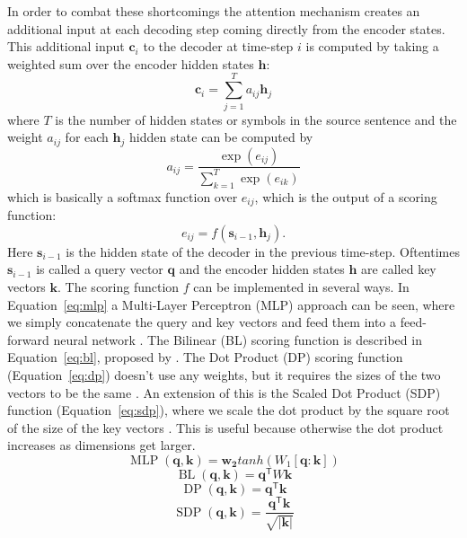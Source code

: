 \documentclass[12pt]{article}
\DeclareMathOperator{\MLP}{MLP}
\DeclareMathOperator{\DP}{DP}
\DeclareMathOperator{\SDP}{SDP}
\DeclareMathOperator{\BL}{BL}
\begin{document}
In order to combat these shortcomings the attention mechanism creates an additional input at each decoding step coming directly from the encoder states. This additional input \(\bm{c}_i\) to the decoder at time-step \(i\) is computed by taking a weighted sum over the encoder hidden states \(\bm{h}\):
\begin{equation} \label{eqattention}
\bm{c}_i=\sum_{j=1}^{T}a_{ij}\bm{h}_j
\end{equation}
where \(T\) is the number of hidden states or symbols in the source sentence and the weight \(a_{ij}\) for each \(\bm{h}_j\) hidden state can be computed by
\begin{equation}
a_{ij}=\frac{\exp(e_{ij})}{\sum_{k=1}^{T}\exp(e_{ik})}
\end{equation}
which is basically a softmax function over \(e_{ij}\), which is the output of a scoring function:
\begin{equation}
e_{ij}=f(\bm{s}_{i-1},\bm{h}_j).
\end{equation}
Here \(\bm{s}_{i-1}\) is the hidden state of the decoder in the previous time-step. Oftentimes \(\bm{s}_{i-1}\) is called a query vector \(\bm{q}\) and the encoder hidden states \(\bm{h}\) are called key vectors \(\bm{k}\).
The scoring function \(f\) can be implemented in several ways. In Equation~\ref{eq:mlp} a Multi-Layer Perceptron (MLP) approach can be seen, where we simply concatenate the query and key vectors and feed them into a feed-forward neural network \cite{Bahdanau:2014}. The Bilinear (BL) scoring function is described in Equation~\ref{eq:bl}, proposed by \cite{Luong:2015}. The Dot Product (DP) scoring function (Equation~\ref{eq:dp}) doesn't use any weights, but it requires the sizes of the two vectors to be the same \cite{Luong:2015}. An extension of this is the Scaled Dot Product (SDP) function (Equation~\ref{eq:sdp}), where we scale the dot product by the square root of the size of the key vectors \cite{Vaswani:2017}. This is useful because otherwise the dot product increases as dimensions get larger.
\begin{equation} \label{eq:mlp}
\MLP(\bm{q},\bm{k})=\bm{w_2}tanh(W_1[\bm{q}:\bm{k}])
\end{equation}
\begin{equation} \label{eq:bl}
\BL(\bm{q},\bm{k})=\bm{q}^\mathsf{T}W\bm{k}
\end{equation}
\begin{equation} \label{eq:dp}
\DP(\bm{q},\bm{k})=\bm{q}^\mathsf{T}\bm{k}
\end{equation}
\begin{equation} \label{eq:sdp}
\SDP(\bm{q},\bm{k})=\frac{\bm{q}^\mathsf{T}\bm{k}}{\sqrt{|\bm{k}|}}
\end{equation}
\end{document}
